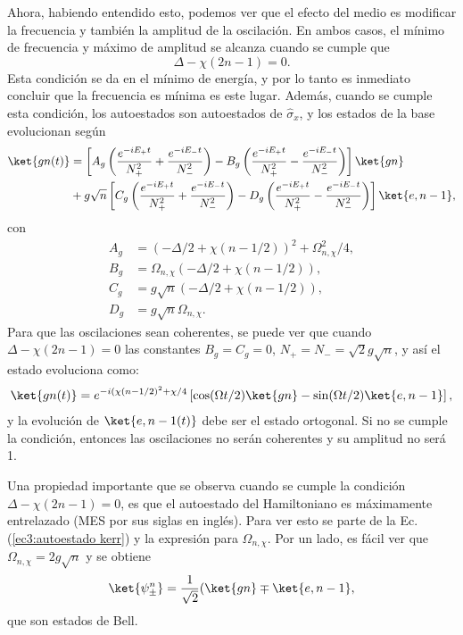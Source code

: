 Ahora, habiendo entendido esto, podemos ver que el efecto del medio es modificar la frecuencia y también la amplitud de la oscilación. En ambos casos, el mínimo de frecuencia y máximo de amplitud se alcanza cuando se cumple que 
\begin{equation}
    \Delta-\chi(2n-1)=0.
\end{equation}
Esta condición se da en el mínimo de energía, y por lo tanto es inmediato concluir que la frecuencia es mínima es este lugar. Además, cuando se cumple esta condición, los autoestados son autoestados de $\hat \sigma_x$, y los estados de la base evolucionan según
\begin{equation}
    \begin{aligned}
        \ket{gn(t)} &=\left[ A_g \left( \frac{e^{-iE_+t}}{N_+^2}+\frac{e^{-iE_-t}}{N_-^2}\right)-B_g\left( \frac{e^{-iE_+t}}{N_+^2}-\frac{e^{-iE_-t}}{N_-^2}\right) \right] \ket{gn} \\
        & + g\sqrt{n}\left[C_g\left( \frac{e^{-iE_+t}}{N_+^2}+\frac{e^{-iE_-t}}{N_-^2}\right)-D_g\left( \frac{e^{-iE_+t}}{N_+^2}-\frac{e^{-iE_-t}}{N_-^2}\right)\right]\ket{e,n-1},
    \end{aligned}
\end{equation}
con
\begin{equation*}
    \begin{aligned}
        A_g &= (-\Delta/2+\chi(n-1/2))^2+\Omega_{n,\chi}^2/4, \\
        B_g &= \Omega_{n,\chi}(-\Delta/2+\chi(n-1/2)), \\
        C_g & = g\sqrt{n}(-\Delta/2+\chi(n-1/2)), \\
        D_g & = g\sqrt{n}\Omega_{n,\chi}. 
    \end{aligned}
\end{equation*}
Para que las oscilaciones sean coherentes, se puede ver que cuando $\Delta-\chi(2n-1)=0$ las constantes $B_g=C_g=0$, $N_+=N_-=\sqrt{2}g\sqrt{n}$, y así el estado evoluciona como:
\begin{equation}
    \ket{gn(t)}=e^{-i(\chi(n-1/2)^2+\chi/4}\left[\cos(\Omega t/2)\ket{gn}-\sin(\Omega t/2)\ket{e,n-1}\right],
\end{equation}
y la evolución de $\ket{e,n-1(t)}$ debe ser el estado ortogonal. Si no se cumple la condición, entonces las oscilaciones no serán coherentes y su amplitud no será 1.

Una propiedad importante que se observa cuando se cumple la condición $\Delta-\chi(2n-1)=0$, es que el autoestado del Hamiltoniano es máximamente entrelazado (MES por sus siglas en inglés). Para ver esto se parte de la Ec. (\ref{ec3:autoestado kerr}) y la expresión para $\Omega_{n,\chi}$. Por un lado, es fácil ver que $\Omega_{n,\chi}=2g\sqrt{n}$ y se obtiene 
\begin{equation}
    \ket{\psi_\pm^n}=\frac{1}{\sqrt{2}}(\ket{gn}\mp \ket{e,n-1},
    \label{ec3:bell}
\end{equation}
que son estados de Bell. 


